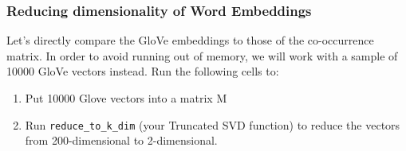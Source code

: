 \documentclass[11pt]{article}
\providecommand{\tightlist}{%
      \setlength{\itemsep}{0pt}\setlength{\parskip}{0pt}}
\begin{document}
\subsubsection{Reducing dimensionality of Word
    Embeddings}\label{reducing-dimensionality-of-word-embeddings}

Let's directly compare the GloVe embeddings to those of the
co-occurrence matrix. In order to avoid running out of memory, we will
work with a sample of 10000 GloVe vectors instead. Run the following
cells to:

\begin{enumerate}
    \def\labelenumi{\arabic{enumi}.}
    \tightlist
    \item
          Put 10000 Glove vectors into a matrix M
    \item
          Run \texttt{reduce\_to\_k\_dim} (your Truncated SVD function) to
          reduce the vectors from 200-dimensional to 2-dimensional.
\end{enumerate}
\end{document}
